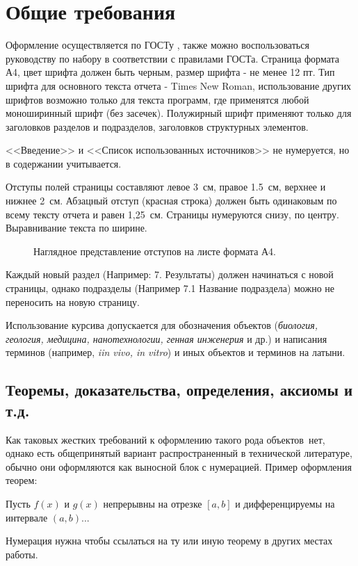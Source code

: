 \section{Общие требования}
Оформление осуществляется по ГОСТу \cite{Standart2017}, также можно воспользоваться руководству по набору в соответствии с правилами ГОСТа\cite{rule}. Страница формата А4, цвет шрифта должен быть черным, размер шрифта - не менее 12 пт. Тип шрифта для основного текста отчета - Times New Roman, использование других шрифтов возможно только для текста программ, где применятся любой моноширинный шрифт (без засечек). Полужирный шрифт применяют только для заголовков разделов и подразделов, заголовков структурных элементов. 
\par <<Введение>> и <<Список использованных источников>> не нумеруется, но в содержании учитывается. 
\par  Отступы полей страницы составляют левое 3~см, правое 1.5~см, верхнее и нижнее 2~см. Абзацный отступ (красная строка) должен быть одинаковым по всему тексту отчета и равен 1,25~см. Страницы нумеруются снизу, по центру. Выравнивание текста по ширине. 
\begin{figure}[H]
\centering
\def\xis{0}
\def\xie{4}
\def\yis{0}
\def\yie{6}
%
\def\xos{-2}
\def\xoe{5.5}
\def\yos{-1}
\def\yoe{7}
%
    \caption{Наглядное представление отступов на листе формата А4.}
\end{figure}
\par Каждый новый раздел (Например: 7. Результаты) должен начинаться с новой страницы, однако подразделы (Например 7.1 Название подраздела) можно не переносить на новую страницу. 
\par Использование курсива допускается для обозначения объектов ({\it биология, геология, медицина, нанотехнологии, генная инженерия} и др.) и написания терминов (например, {\it iin vivo, in vitro}) и иных объектов и терминов на латыни.
\subsection{Теоремы, доказательства, определения, аксиомы и т.д.}
\par Как таковых жестких требований к оформлению такого рода объектов~нет, однако есть общепринятый вариант распространенный в технической литературе, обычно они оформляются как выносной блок с нумерацией. Пример оформления теорем:
\begin{theorem} 
    Пусть $f(x)$ и $g(x)$ непрерывны на отрезке $[a,b]$ и дифференцируемы на интервале $(a,b)$...
\end{theorem}
Нумерация нужна чтобы ссылаться на ту или иную теорему в других местах работы.
    
